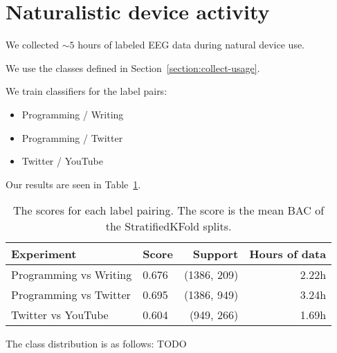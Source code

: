     \section{Naturalistic device activity}

        We collected $\sim5$ hours of labeled EEG data during natural device use.

        We use the classes defined in Section~\ref{section:collect-usage}.

        We train classifiers for the label pairs:

        \begin{itemize}
                \item Programming / Writing
                \item Programming / Twitter
                \item Twitter / YouTube
        \end{itemize}

        Our results are seen in Table~\ref{table:scores-natural}.

        \begin{table}[h]
            \centering
            \begin{tabular}{llrr}
                \toprule
                Experiment & Score & Support & Hours of data \\
                \midrule
                Programming vs Writing & 0.676 & (1386, 209) & 2.22h \\
                Programming vs Twitter & 0.695 &  (1386, 949) & 3.24h \\
                Twitter vs YouTube & 0.604 & (949, 266) & 1.69h \\
                \bottomrule
            \end{tabular}
            \caption{The scores for each label pairing. The score is the mean BAC of the StratifiedKFold splits.}\label{table:scores-natural}
        \end{table}

        The class distribution is as follows: TODO
